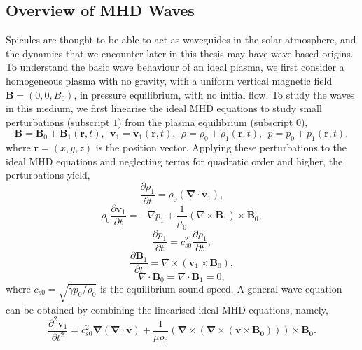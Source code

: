\documentclass[12pt]{ociamthesis}
\newcommand{\bs}[1]{\boldsymbol{#1}}
\newcommand{\bn}{\boldsymbol{\nabla}}
\begin{document}
\subsection{Overview of MHD Waves}
\label{section:mhd_Waves}
Spicules are thought to be able to act as waveguides in the solar atmosphere, and the dynamics that we encounter later in this thesis may have wave-based origins. To understand the basic wave behaviour of an ideal plasma, we first consider a homogeneous plasma with no gravity, with a uniform vertical magnetic field $\bs{B}=(0,0,B_0)$, in pressure equilibrium, with no initial flow. To study the waves in this medium, we first linearise the ideal MHD equations to study small perturbations (subscript $1$) from the plasma equilibrium (subscript $0$),
\begin{equation} \label{eq91}
\boldsymbol{B} = \boldsymbol{B}_0 + \boldsymbol{B}_1 (\boldsymbol{r},t) , \ \ \boldsymbol{v}_1 = \boldsymbol{v}_1 (\boldsymbol{r}, t) , \ \ \rho = \rho_0 + \rho_1 ( \boldsymbol{r},t) , \ \ p = p_0 + p_1 ( \boldsymbol{r}, t) ,
\end{equation}
where $\bs{r} = (x,y,z)$ is the position vector. Applying these perturbations to the ideal MHD equations and neglecting terms for quadratic order and higher, the perturbations yield,
\begin{equation}\label{mhd_lin1}
\frac{\partial \rho_1}{\partial t} = \rho_0 ( \bn \cdot \boldsymbol{v}_1),
\end{equation}
\begin{equation}
\rho_0 \frac{\partial \boldsymbol{v}_1}{\partial t}  = - \nabla p_1 + \frac{1}{\mu_0} (\nabla \times \boldsymbol{B}_1) \times \boldsymbol{B}_0,
\end{equation}
\begin{equation}
\frac{\partial p_1}{\partial t} = c^2_{s0}  \frac{\partial \rho_1}{ \partial t},
\end{equation}
\begin{equation}
\frac{\partial \boldsymbol{B}_1}{\partial t} = \nabla \times (\boldsymbol{v}_1 \times \boldsymbol{B}_0),
\end{equation}
\begin{equation}\label{mhd_lin2}
\nabla \cdot \boldsymbol{B}_0 = \nabla \cdot \boldsymbol{B}_1 = 0 ,
\end{equation}
where $c_{s0} = \sqrt{\gamma p_0/ \rho_0}$ is the equilibrium sound speed. A general wave equation can be obtained by combining the linearised ideal MHD equations, namely,
\begin{equation}\label{wave_eq}
    \frac{\partial^2 \bs{v}_1}{\partial t^2} = c_{s0}^2 \bn (\bn \cdot \bs{v}) + \frac{1}{\mu \rho_0} (\bn \times (\bn \times (\bs{v}\times\bs{B_0}))) \times \bs{B_0}.
\end{equation}
\end{document}

